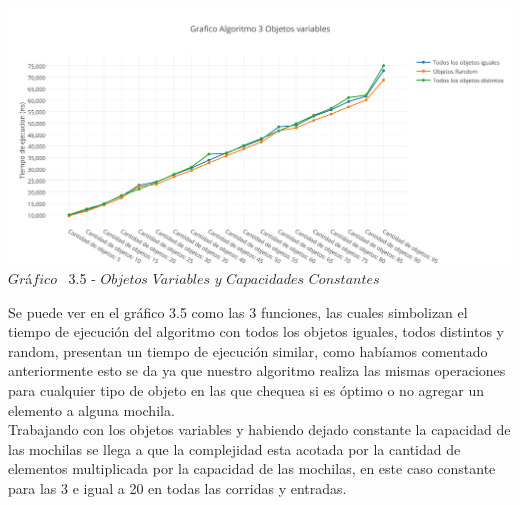 \vspace*{0.3cm} \vspace*{0.3cm}
  \begin{center}
 \includegraphics[scale=0.65]{./EJ3/objetos.png}
  {$Gr$\'a$fico$ \ 3.5 - $Objetos$ $Variables$ $y$ $Capacidades$ $Constantes$}
  \end{center}
  \vspace*{0.3cm}
  
Se puede ver en el gr\'afico 3.5 como las 3 funciones, las cuales simbolizan el tiempo de ejecuci\'on del algoritmo con todos los objetos iguales, todos distintos y random, presentan un tiempo de ejecuci\'on similar, como hab\'iamos comentado anteriormente esto se da ya que nuestro algoritmo realiza las mismas operaciones para cualquier tipo de objeto en las que chequea si es \'optimo o no agregar un elemento a alguna mochila.\\

Trabajando con los objetos variables y habiendo dejado constante la capacidad de las mochilas se llega a que la complejidad esta acotada por la cantidad de elementos multiplicada por la capacidad de las mochilas, en este caso constante para las 3 e igual a 20 en todas las corridas y entradas.\\
